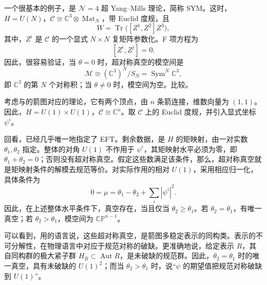 \begin{example}\label{ex:5.21}
一个很基本的例子，是 $\mathcal{N}=4$ 超 Yang--Mills 理论，简称 SYM。这时，$H=U(N)$，$\mathcal{C}\cong\mathbb{C}^3\otimes\operatorname{Mat}_N$，带 Euclid 度规，且
\begin{equation}\label{eq:5.82}
W=\operatorname{Tr}\bigl([Z^1,Z^2]Z^3\bigr),
\end{equation}
其中，$Z^i$ 是 $\mathcal{C}$ 的一个显式 $N\times N$ 复矩阵参数化\footnotemark。F 项方程为
\[
[Z^i,Z^j]=0.
\]
因此，很容易验证，当 $\theta=0$ 时，超对称真空的模空间是
\[
\mathcal{M}\cong(\mathbb{C}^3)^N/S_N
=\operatorname{Sym}^N\mathbb{C}^3,
\]
即 $\mathbb{C}^3$ 的第 $N$ 个对称积；当 $\theta\ne0$ 时，模空间为空。比较。
\end{example}

\begin{example}\label{ex:5.22}
考虑与的箭图对应的理论，它有两个顶点，由 $n$ 条箭连接，维数向量为 $(1,1)$。因此，$H=U(1)\times U(1)$，$\mathcal{C}\cong\mathbb{C}^n$。取 $\mathcal{C}$ 上的 Euclid 度规，并引入显式坐标 $\psi^i$。

回看，已经几乎唯一地指定了 EFT。剩余数据，是 $H$ 的矩映射，由一对实数 $\theta_1,\theta_2$ 指定。整体的对角 $U(1)$ 不作用于 $\psi^i$，其矩映射水平必须为零，即 $\theta_1+\theta_2=0$；否则没有超对称真空。假定这些数满足该条件，那么，超对称真空就是矩映射条件的解模去规范等价。对实际作用的相对 $U(1)$，采用相应归一化，具体条件为
\begin{equation}\label{eq:5.83}
0=\mu=\theta_1-\theta_2+\sum_i|\psi^i|^2.
\end{equation}
因此，在上述整体水平条件下，真空存在，当且仅当 $\theta_2\ge\theta_1$。若 $\theta_2=\theta_1$，有唯一真空；若 $\theta_2>\theta_1$，模空间为 $\mathbb{CP}^{n-1}$。

可以看到，用的语言说，这些超对称真空，是箭图多稳定表示的同构类。表示的不可分解性，在物理语言中对应于规范对称的破缺。更准确地说，给定表示 $R$，其自同构群的极大紧子群 $H_R\subset\operatorname{Aut}R$，是未破缺的规范群。因此，$\theta_2=\theta_1$ 时的唯一真空，具有未破缺的 $U(1)^2$；而当 $\theta_2>\theta_1$ 时，说“$\psi$ 的期望值把规范对称破缺到 $U(1)$”。
\end{example}

